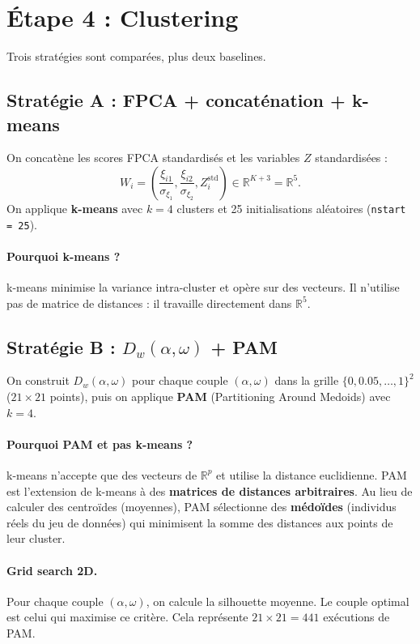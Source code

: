 \documentclass[11pt, a4paper]{article}
\newcommand{\R}{\mathbb{R}}
\newcommand{\Dw}{D_w}
\theoremstyle{definition}
\theoremstyle{remark}
\begin{document}
\section{Étape 4 : Clustering}
\label{sec:clustering}

Trois stratégies sont comparées, plus deux baselines.

\subsection{Stratégie A : FPCA + concaténation + k-means}

On concatène les scores FPCA standardisés et les variables $Z$ standardisées :
\[
  W_i = \left(\frac{\xi_{i1}}{\sigma_{\xi_1}}, \frac{\xi_{i2}}{\sigma_{\xi_2}},
  Z_i^{\text{std}}\right) \in \R^{K+3} = \R^5.
\]
On applique \textbf{k-means} avec $k = 4$ clusters et 25 initialisations
aléatoires (\texttt{nstart = 25}).

\paragraph{Pourquoi k-means ?} k-means minimise la variance intra-cluster et
opère sur des vecteurs. Il n'utilise pas de matrice de distances : il travaille
directement dans $\R^5$.

\subsection{Stratégie B : $\Dw(\alpha, \omega)$ + PAM}

On construit $\Dw(\alpha, \omega)$ pour chaque couple $(\alpha, \omega)$ dans
la grille $\{0, 0.05, \ldots, 1\}^2$ ($21 \times 21$ points), puis on applique \textbf{PAM}
(Partitioning Around Medoids) avec $k = 4$.

\paragraph{Pourquoi PAM et pas k-means ?}
k-means n'accepte que des vecteurs de $\R^p$ et utilise la distance euclidienne.
PAM est l'extension de k-means à des \textbf{matrices de distances arbitraires}.
Au lieu de calculer des centroïdes (moyennes), PAM sélectionne des
\textbf{médoïdes} (individus réels du jeu de données) qui minimisent la somme
des distances aux points de leur cluster.

\paragraph{Grid search 2D.}
Pour chaque couple $(\alpha, \omega)$, on calcule la silhouette moyenne. Le
couple optimal est celui qui maximise ce critère. Cela représente
$21 \times 21 = 441$ exécutions de PAM.
\end{document}
